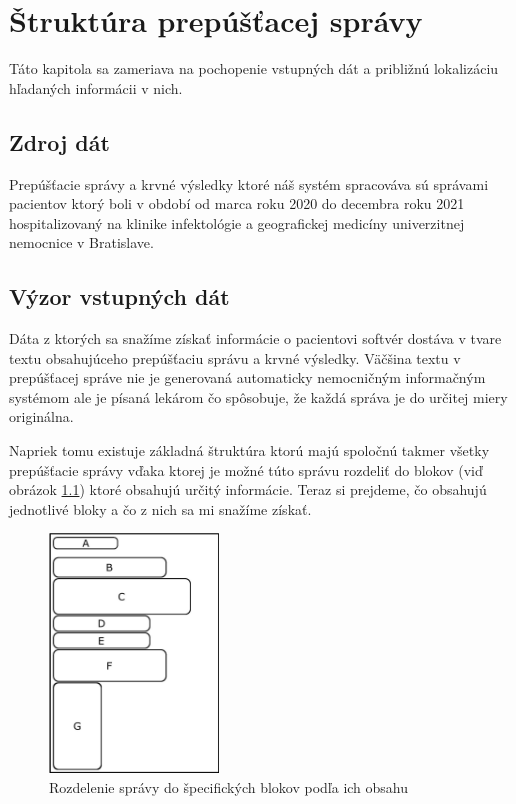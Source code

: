 \chapter{Štruktúra prepúšťacej správy}

\label{kap:strukSpravy} %

Táto kapitola sa zameriava na pochopenie vstupných dát a približnú lokalizáciu hľadaných informácii v nich.

\section{Zdroj dát}

Prepúšťacie správy a krvné výsledky ktoré náš systém spracováva sú správami pacientov ktorý boli v období od marca roku 2020 do decembra roku 2021 hospitalizovaný na klinike infektológie a geografickej medicíny univerzitnej nemocnice v Bratislave.

\section{Výzor vstupných dát}

Dáta z ktorých sa snažíme získať informácie o pacientovi softvér dostáva v tvare textu obsahujúceho prepúšťaciu správu a krvné výsledky. Väčšina textu v prepúšťacej správe nie je generovaná automaticky nemocničným informačným systémom ale je písaná lekárom čo spôsobuje, že každá správa je do určitej miery originálna.

Napriek tomu existuje základná štruktúra ktorú majú spoločnú takmer všetky prepúšťacie správy vďaka ktorej je možné túto správu rozdeliť do blokov (viď obrázok \ref{obr:sprava}) ktoré obsahujú určitý informácie. Teraz si prejdeme, čo obsahujú jednotlivé bloky a čo z nich sa mi snažíme získať.

\begin{figure}
	\centerline{\includegraphics[width=0.4\textwidth]{images/vyzor_spravy}}
	\caption[Rozloženie správy]{Rozdelenie správy do špecifických blokov podľa ich obsahu}
	\label{obr:sprava}
\end{figure}

